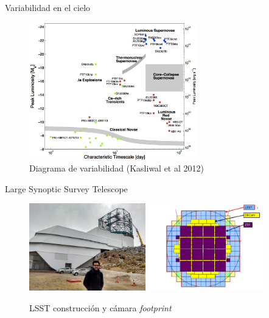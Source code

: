 \documentclass[11pt]{beamer}
\begin{document}
\begin{frame}{Variabilidad en el cielo}
    \begin{figure}
        \centering
        \includegraphics[width=0.65\textwidth]{./images/imgs_seminario1/taumv.png}
        \caption{Diagrama de variabilidad (Kasliwal et al 2012)}
        \label{fig:diag_lleno}
    \end{figure}
\end{frame}

\begin{frame}{Large Synoptic Survey Telescope}
    \begin{figure}
        \includegraphics[width=0.45\textwidth]{./images/yo+LSST.jpg}
        \includegraphics[width=0.45\textwidth]{./images/imgs_seminario1/LSST+DECam+ZTF.jpg}
        \caption{LSST construcci\'on y c\'amara \textit{footprint}}
        \label{fig:camaras}
    \end{figure}
\end{frame}
\end{document}
